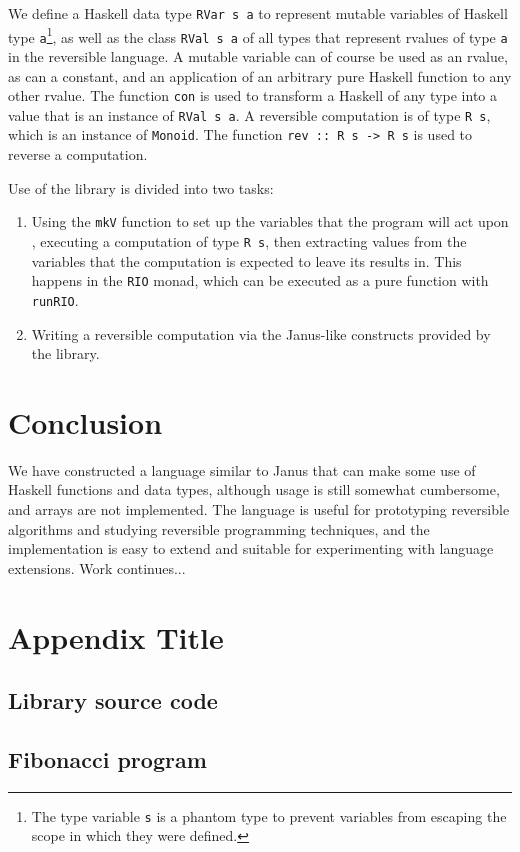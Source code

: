 \documentclass[10pt]{sigplanconf}
\begin{document}
We define a Haskell data type \texttt{RVar s a} to represent mutable
variables of Haskell type \texttt{a}\footnote{The type variable
  \texttt{s} is a phantom type to prevent variables from escaping the
  scope in which they were defined.}, as well as the class
\texttt{RVal s a} of all types that represent rvalues of type
\texttt{a} in the reversible language.  A mutable variable can of
course be used as an rvalue, as can a constant, and an application of
an arbitrary pure Haskell function to any other rvalue.  The function
\texttt{con} is used to transform a Haskell of any type into a value
that is an instance of \texttt{RVal s a}.  A reversible computation is
of type \texttt{R s}, which is an instance of \texttt{Monoid}.  The
function \texttt{rev :: R s -> R s} is used to reverse a computation.

Use of the library is divided into two tasks:

\begin{enumerate}
\item Using the \texttt{mkV} function to set up the variables that the
  program will act upon , executing a computation of type \texttt{R
    s}, then extracting values from the variables that the computation
  is expected to leave its results in.  This happens in the
  \texttt{RIO} monad, which can be executed as a pure function with
  \texttt{runRIO}.
\item Writing a reversible computation via the Janus-like constructs provided by the library.
\end{enumerate}

\section{Conclusion}

We have constructed a language similar to Janus that can make some use
of Haskell functions and data types, although usage is still somewhat
cumbersome, and arrays are not implemented.  The language is useful
for prototyping reversible algorithms and studying reversible
programming techniques, and the implementation is easy to extend and
suitable for experimenting with language extensions.  Work
continues...







\appendix
\section{Appendix Title}

\subsection{Library source code}

\tiny{

}


\subsection{Fibonacci program}

\tiny{

}
\end{document}
